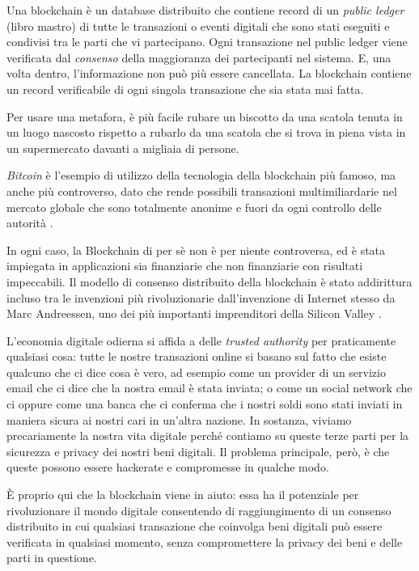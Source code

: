 Una blockchain è un database distribuito che contiene record di un \textit{public ledger} (libro mastro) di tutte le transazioni o eventi digitali che sono stati eseguiti e condivisi tra le parti che vi partecipano. Ogni transazione nel public ledger viene verificata dal \textit{consenso} della maggioranza dei partecipanti nel sistema. E, una volta dentro, l'informazione non può più essere cancellata. La blockchain contiene un record verificabile di ogni singola transazione che sia stata mai fatta.

Per usare una metafora, è più facile rubare un biscotto da una scatola tenuta in un luogo nascosto rispetto a rubarlo da una scatola che si trova in piena vista in un supermercato davanti a migliaia di persone.

\textit{Bitcoin} è l'esempio di utilizzo della tecnologia della blockchain più famoso, ma anche più controverso, dato che rende possibili transazioni multimiliardarie nel mercato globale che sono totalmente anonime e fuori da ogni controllo delle autorità \cite{Nakamoto2008} \cite{BitcoinProject2014}. 

In ogni caso, la Blockchain di per sè non è per niente controversa, ed è stata impiegata in applicazioni sia finanziarie che non finanziarie con risultati impeccabili. Il modello di consenso distribuito della blockchain è stato addirittura incluso tra le invenzioni più rivoluzionarie dall'invenzione di Internet stesso da Marc Andreessen, uno dei più importanti imprenditori della Silicon Valley \cite{Crosby2016}.

L'economia digitale odierna si affida a delle \textit{trusted authority} per praticamente qualsiasi cosa: tutte le nostre transazioni online si basano sul fatto che esiste qualcuno che ci dice cosa è vero, ad esempio come un provider di un servizio email che ci dice che la nostra email è stata inviata; o come un social network che ci oppure come una banca che ci conferma che i nostri soldi sono stati inviati in maniera sicura ai nostri cari in un'altra nazione. In sostanza, viviamo precariamente la nostra vita digitale perch\'e contiamo su queste terze parti per la sicurezza e privacy dei nostri beni digitali. Il problema principale, però, è che queste possono essere hackerate e compromesse in qualche modo.

È proprio qui che la blockchain viene in aiuto: essa ha il potenziale per rivoluzionare il mondo digitale consentendo di raggiungimento di un consenso distribuito in cui qualsiasi transazione che coinvolga beni digitali può essere verificata in qualsiasi momento, senza compromettere la privacy dei beni e delle parti in questione. 

